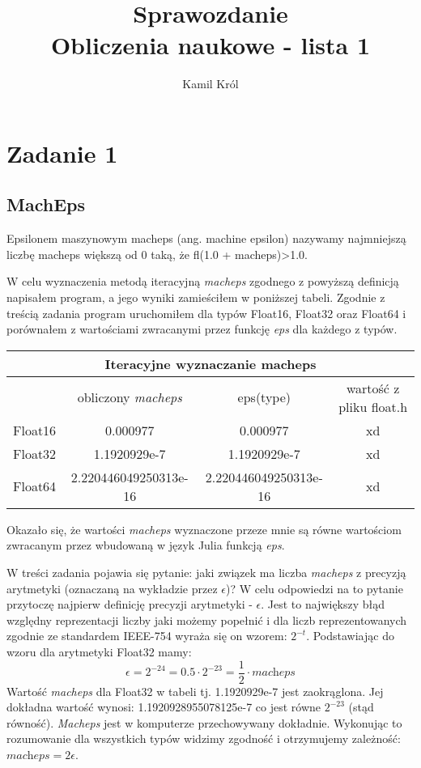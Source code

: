 \documentclass[]{article}
\title{
	Sprawozdanie \\
	\large 
	Obliczenia naukowe - lista 1}
\author{Kamil Król}
\date{}
\begin{document}
	
	\maketitle
	
	\section*{Zadanie 1}
	
	\subsection*{MachEps}
	Epsilonem maszynowym macheps (ang. machine epsilon) nazywamy najmniejszą liczbę macheps większą od 0 taką, że fl(1.0 + macheps)\textgreater 1.0.
	
	W celu wyznaczenia metodą iteracyjną \textit{macheps} zgodnego z powyższą definicją napisałem program, a jego wyniki zamieściłem w poniższej tabeli. Zgodnie z treścią zadania program uruchomiłem dla typów Float16, Float32 oraz Float64 i porównałem z wartościami zwracanymi przez funkcję \textit{eps} dla każdego z typów.
	
	\begin{table}[h!]
		\centering
		\label{tab:table1}
		\begin{tabular}{|c|c|c|c|}
			\multicolumn{4}{c}{Iteracyjne wyznaczanie macheps}\\
			\hline
			& obliczony \textit{macheps} & eps(type) & wartość z pliku float.h \\
			\hline
			Float16 & 0.000977 & 0.000977 & xd \\
			\hline
			Float32 & 1.1920929e-7 & 1.1920929e-7 & xd \\
			\hline
			Float64 & 2.220446049250313e-16 & 2.220446049250313e-16 & xd \\
			\hline
		\end{tabular}
	\end{table}
	
	Okazało się, że wartości \textit{macheps} wyznaczone przeze mnie są równe wartościom zwracanym przez wbudowaną w język Julia funkcją \textit{eps}.
	
	W treści zadania pojawia się pytanie: jaki związek ma liczba \textit{macheps} z precyzją arytmetyki (oznaczaną na wykładzie przez $\epsilon$)? W celu odpowiedzi na to pytanie przytoczę najpierw definicję precyzji arytmetyki - $\epsilon$. Jest to największy błąd względny reprezentacji liczby jaki możemy popełnić i dla liczb reprezentowanych zgodnie ze standardem IEEE-754 wyraża się on wzorem: \(2^{-t}\). Podstawiając do wzoru dla arytmetyki Float32 mamy: \[\epsilon = 2^{-24} = 0.5 \cdot 2 ^{-23} = \frac{1}{2} \cdot \textit{macheps}\]
	Wartość \textit{macheps} dla Float32 w tabeli tj. 1.1920929e-7 jest zaokrąglona. Jej dokładna wartość wynosi: 1.1920928955078125e-7 co jest równe \(2 ^{-23}\) (stąd równość). \textit{Macheps} jest w komputerze przechowywany dokładnie.
	Wykonując to rozumowanie dla wszystkich typów widzimy zgodność i otrzymujemy zależność: \mbox{\(\textit{macheps} = 2\epsilon\)}.
	
\end{document}
